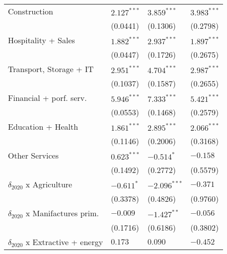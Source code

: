 \begin{tabular}{llll}
Construction                                       &      $2.127^{***}$ &      $3.859^{***}$ &      $3.983^{***}$ \\
                                                   &           (0.0441) &           (0.1306) &           (0.2798) \\
Hospitality + Sales                                &      $1.882^{***}$ &      $2.937^{***}$ &      $1.897^{***}$ \\
                                                   &           (0.0447) &           (0.1726) &           (0.2675) \\
Transport, Storage + IT                            &      $2.951^{***}$ &      $4.704^{***}$ &      $2.987^{***}$ \\
                                                   &           (0.1037) &           (0.1587) &           (0.2655) \\
Financial + porf. serv.                            &      $5.946^{***}$ &      $7.333^{***}$ &      $5.421^{***}$ \\
                                                   &           (0.0553) &           (0.1468) &           (0.2579) \\
Education + Health                                 &      $1.861^{***}$ &      $2.895^{***}$ &      $2.066^{***}$ \\
                                                   &           (0.1146) &           (0.2006) &           (0.3168) \\
Other Services                                     &      $0.623^{***}$ &         $-0.514^*$ &           $-0.158$ \\
                                                   &           (0.1492) &           (0.2772) &           (0.5579) \\
$\delta_{2020}$ x Agriculture                      &         $-0.611^*$ &     $-2.096^{***}$ &           $-0.371$ \\
                                                   &           (0.3378) &           (0.4826) &           (0.9760) \\
$\delta_{2020}$ x Manifactures prim.               &           $-0.009$ &      $-1.427^{**}$ &           $-0.056$ \\
                                                   &           (0.1716) &           (0.6186) &           (0.3802) \\
$\delta_{2020}$ x Extractive + energy              &            $0.173$ &            $0.090$ &           $-0.452$ \\

\end{tabular}
